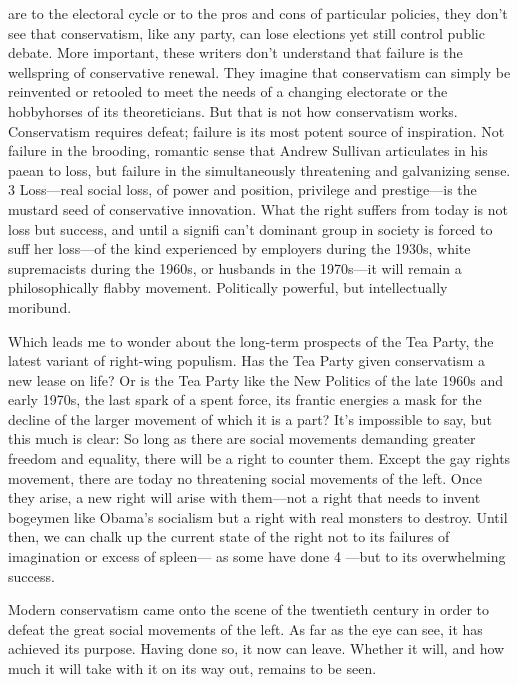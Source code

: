 are to the electoral cycle or to the pros and cons of particular policies, they don’t see that conservatism, like any party, can lose elections yet still control public debate. More important, these writers don’t understand that failure is the wellspring of conservative renewal. They imagine that conservatism can simply be reinvented or retooled to meet the needs of a changing electorate or the hobbyhorses of its theoreticians. But that is not how conservatism works. Conservatism requires defeat; failure is its most potent source of inspiration. Not failure in the brooding, romantic sense that Andrew Sullivan articulates in his paean to loss, but failure in the simultaneously threatening and galvanizing sense. {\color{blue} 3 } Loss—real social loss, of power and position, privilege and prestige—is the mustard seed of conservative innovation. What the right suffers from today is not loss but success, and until a signifi can't dominant group in society is forced to suff her loss—of the kind experienced by employers during the 1930s, white supremacists during the 1960s, or husbands in the 1970s—it will remain a philosophically flabby movement. Politically powerful, but intellectually moribund.{\par} Which leads me to wonder about the long-term prospects of the Tea Party, the latest variant of right-wing populism. Has the Tea Party given conservatism a new lease on life? Or is the Tea Party like the New Politics of the late 1960s and early 1970s, the last spark of a spent force, its frantic energies a mask for the decline of the larger movement of which it is a part? It’s impossible to say, but this much is clear: So long as there are social movements demanding greater freedom and equality, there will be a right to counter them. Except the gay rights movement, there are today no threatening social movements of the left. Once they arise, a new right will arise with them—not a right that needs to invent bogeymen like Obama’s socialism but a right with real monsters to destroy. Until then, we can chalk up the current state of the right not to its failures of imagination or excess of spleen— as some have done {\color{blue} 4 } —but to its overwhelming success.{\par} Modern conservatism came onto the scene of the twentieth century in order to defeat the great social movements of the left. As far as the eye can see, it has achieved its purpose. Having done so, it now can leave. Whether it will, and how much it will take with it on its way out, remains to be seen.{\par}